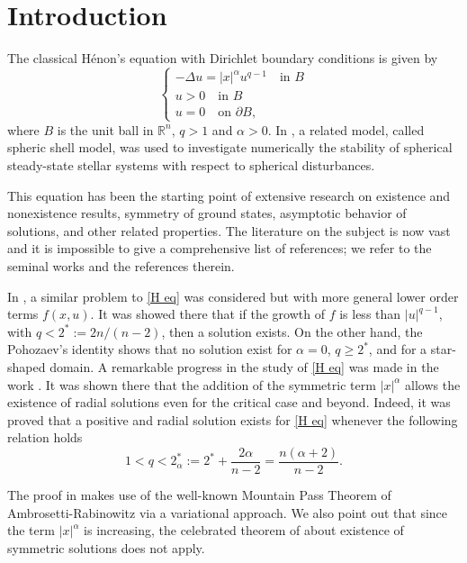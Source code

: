 \documentclass[leqno,twoside, 12pt]{amsart}
\theoremstyle{plain}
\numberwithin{equation}{section} \numberwithin{figure}{section}
\theoremstyle{definition}
\numberwithin{equation}{section}
\begin{document}
\section{Introduction}
The classical H\'enon's equation \cite{H} with Dirichlet boundary conditions is given by
\begin{equation}\label{H eq}
\begin{cases}
-\Delta u= |x|^\alpha u^{q-1} \quad \text{in }B\\
u>0\quad \text{in }B\\
u=0 \quad \text{on }\partial B,
\end{cases}
\end{equation}where $B$ is the unit ball in $\mathbb{R}^n$, $q>1$ and $\alpha>0$. In \cite{H}, a related model, called spheric shell model, was used to investigate numerically the stability of spherical steady-state stellar systems with respect to spherical disturbances.

This equation has been the starting point of extensive research on existence and nonexistence results, symmetry of ground states, asymptotic behavior of solutions, and other related properties. The literature on the subject is now vast and it is impossible to give a comprehensive list of references; we refer to the seminal works \cite{AR,BW,  Nazarov,Ni,   NiSerrin,SerrinTang,   SWS} and the references therein.

  
 

In \cite{AR}, a similar problem to \eqref{H eq} was considered but with more general lower order terms $f(x, u)$. It was showed there that if the growth of $f$ is less than $|u|^{q-1}$, with $q<2^{*}:=2n/(n-2)$, then a solution exists. On the other hand, the Pohozaev's identity shows that no solution exist for $\alpha=0$,  $q\geq 2^{*}$, and for a star-shaped domain.  A remarkable progress in the study of \eqref{H eq} was made in the work \cite{Ni}. It was shown there that the addition of the symmetric term $|x|^{\alpha}$ allows   the existence of radial solutions even for the critical case and beyond. Indeed, it was proved that a positive and radial solution exists for \eqref{H eq} whenever the following relation holds
\begin{equation}\label{Ni cond}
1<q<2_\alpha^* := 2^{*}+\dfrac{2\alpha}{n-2} = \frac{n(\alpha+2)}{n-2}. 
\end{equation} 


 The proof in \cite{Ni} makes use of the well-known Mountain Pass Theorem of Ambrosetti-Rabinowitz \cite{AR} via a variational approach. We also point out that  since the term $|x|^{\alpha}$ is increasing, the celebrated theorem of \cite{GNN} about existence of symmetric solutions does not apply.  
 
\end{document}
